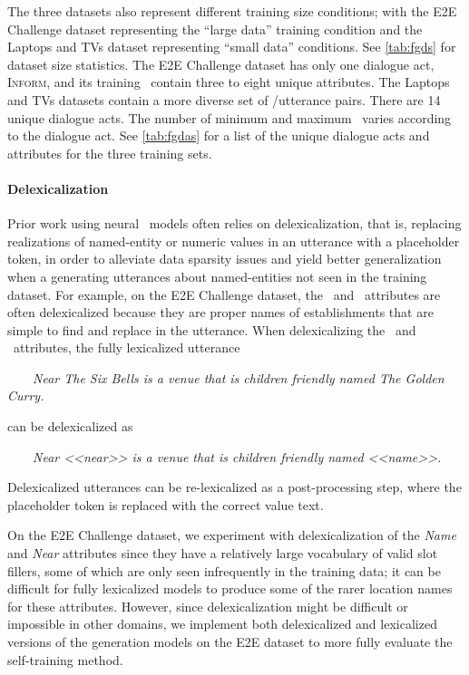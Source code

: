 The three datasets also represent different training size conditions; with the
E2E Challenge dataset representing the ``large data'' training condition and
the Laptops and TVs dataset representing ``small data'' conditions. See
\autoref{tab:fgds} for dataset size statistics.  The E2E Challenge dataset has
only one dialogue act, \textsc{Inform}, and its training
\meaningrepresentations~contain three to eight unique attributes.  The Laptops
and TVs datasets contain a more diverse set of \meaningrepresentation/utterance
pairs. There are 14 unique dialogue acts.  The number of minimum and maximum
\attributes~varies according to the dialogue act. See \autoref{tab:fgdas} for a
list of the unique dialogue acts and attributes for the three training sets. 



\paragraph{Delexicalization}
Prior work using neural \naturallanguagegeneration~models often relies on
delexicalization, that is, replacing realizations of named-entity or numeric
values in an utterance with a placeholder token, in order to alleviate data
sparsity issues and yield better generalization when a generating utterances
about named-entities not seen in the training dataset. For example, on the E2E
Challenge dataset, the ~and ~attributes are often
delexicalized because they are proper names of establishments that are simple
to find and replace in the utterance.  When delexicalizing the ~and
~attributes, the fully lexicalized utterance 

\begin{center}\noindent~~~~\textit{Near The Six Bells is a venue that is children
friendly named The Golden Curry.}\end{center}

\noindent can be delexicalized as

\begin{center}\noindent ~~~~\textit{Near <<near>> is a venue that is children
friendly named <<name>>.}\end{center}

\noindent Delexicalized utterances can be re-lexicalized as a post-processing
step, where the placeholder token is replaced with the correct value text.

On the E2E Challenge dataset, we experiment with delexicalization of the
\textit{Name} and \textit{Near} attributes since they have a relatively large
vocabulary of valid slot fillers, some of which are only seen  infrequently in
the training data; it can be difficult for fully lexicalized models to produce
some of the rarer location names for these attributes.  However, since
delexicalization might be difficult or impossible in other domains, we
implement both delexicalized and lexicalized versions of the generation models
on the E2E dataset to more fully evaluate the self-training method.
   
